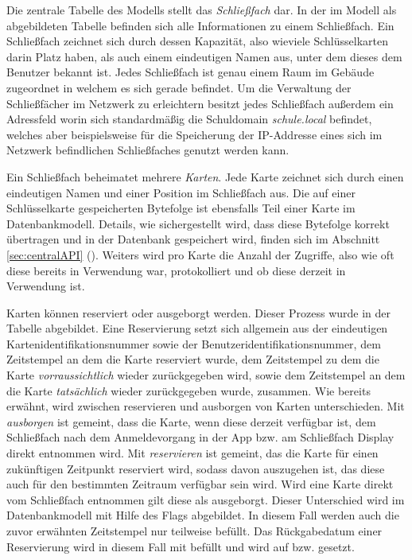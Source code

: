 \noindent
Die zentrale Tabelle des Modells stellt das \textit{Schließfach} dar. In der im Modell als  abgebildeten Tabelle befinden sich alle Informationen zu einem Schließfach. Ein Schließfach zeichnet sich durch dessen Kapazität, also wieviele Schlüsselkarten darin Platz haben, als auch einem eindeutigen Namen aus, unter dem dieses dem Benutzer bekannt ist. Jedes Schließfach ist genau einem Raum im Gebäude zugeordnet in welchem es sich gerade befindet. Um die Verwaltung der Schließfächer im Netzwerk zu erleichtern besitzt jedes Schließfach außerdem ein Adressfeld worin sich standardmäßig die Schuldomain \textit{schule.local} befindet, welches aber beispielsweise für die Speicherung der IP-Addresse eines sich im Netzwerk befindlichen Schließfaches genutzt werden kann.\bigskip

\noindent
Ein Schließfach beheimatet mehrere \textit{Karten}. Jede Karte zeichnet sich durch einen eindeutigen Namen und einer Position im Schließfach aus. Die auf einer Schlüsselkarte gespeicherten Bytefolge ist ebensfalls Teil einer Karte im Datenbankmodell. Details, wie sichergestellt wird, dass diese Bytefolge korrekt übertragen und in der Datenbank gespeichert wird, finden sich im Abschnitt \ref{sec:centralAPI} (). Weiters wird pro Karte die Anzahl der Zugriffe, also wie oft diese bereits in Verwendung war, protokolliert und ob diese derzeit in Verwendung ist.\bigskip

\newpage
\noindent
Karten können reserviert oder ausgeborgt werden. Dieser Prozess wurde in der\\  Tabelle abgebildet. Eine Reservierung setzt sich allgemein aus der eindeutigen Kartenidentifikationsnummer sowie der Benutzeridentifikationsnummer, dem Zeitstempel an dem die Karte reserviert wurde, dem Zeitstempel zu dem die Karte \textit{vorraussichtlich} wieder zurückgegeben wird, sowie dem Zeitstempel an dem die Karte \textit{tatsächlich} wieder zurückgegeben wurde, zusammen.    
Wie bereits erwähnt, wird zwischen reservieren und ausborgen von Karten unterschieden. Mit \frqq{}\textit{ausborgen}\flqq{} ist gemeint, dass die Karte, wenn diese derzeit verfügbar ist, dem Schließfach nach dem Anmeldevorgang in der App bzw. am Schließfach Display direkt entnommen wird. Mit \frqq{}\textit{reservieren}\flqq{} ist gemeint, das die Karte für einen zukünftigen Zeitpunkt reserviert wird, sodass davon auszugehen ist, das diese auch für den bestimmten Zeitraum verfügbar sein wird.
Wird eine Karte direkt vom Schließfach entnommen gilt diese als ausgeborgt. Dieser Unterschied wird im Datenbankmodell mit Hilfe des \frqq{}\flqq{} Flags abgebildet. In diesem Fall werden auch die zuvor erwähnten Zeitstempel nur teilweise befüllt. Das Rückgabedatum einer Reservierung \frqq{}\flqq{} wird in diesem Fall mit \frqq{}\flqq{} befüllt und \frqq{}\flqq{} wird auf \frqq{}\flqq{} bzw. \frqq{}\flqq{} gesetzt.\bigskip


